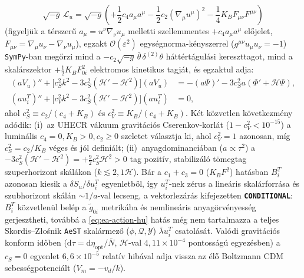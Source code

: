 \documentclass[11pt,a4paper]{article}
\begin{document}
\begin{enumerate}
    \begin{equation}
        \sqrt{-g}\,\mathcal{L}_u = \sqrt{-g}\!\left(+\frac{1}{2} c_4 a_\mu a^\mu - \frac{1}{2} c_2 (\nabla_\mu u^\mu)^2 - \frac{1}{4} K_B F_{\mu\nu} F^{\mu\nu}\right)
        \label{eq:ea-action-hu}
    \end{equation}
    (figyeljük a térszerű $a_\mu = u^\nu\nabla_\nu u_\mu$ melletti szellemmentes $+c_4 a_\mu a^\mu$ előjelet, $F_{\mu\nu} = \nabla_\mu u_\nu - \nabla_\nu u_\mu$), egzakt $\mathcal{O}(\varepsilon^2)$ egységnorma-kényszerrel ($g^{\mu\nu}u_\mu u_\nu = -1$) \texttt{SymPy}-ban megőrzi mind a $-c_2\sqrt{-g}\,\bar\theta\,\delta^{(2)}\theta$ háttértágulási kereszttagot, mind a skalárszektor $+\frac{1}{2} K_B F_{0i}^2$ elektromos kinetikus tagját, és egzaktul adja:
    \begin{equation}
    \begin{aligned}
        (a V_u)'' + \bigl[c_S^2 k^2 - 3 c_S^2 (\mathcal{H}' - \mathcal{H}^2)\bigr](a V_u) &= -(a\Psi)' - 3 c_S^2 a(\Phi' + \mathcal{H}\Psi), \\
        (a u_i^T)'' + \bigl[c_V^2 k^2 - 3 c_S^2 (\mathcal{H}' - \mathcal{H}^2)\bigr](a u_i^T) &= 0,
    \end{aligned}
        \label{eq:aest-director-eoms-hu}
    \end{equation}
    ahol $c_S^2 \equiv c_2/(c_4 + K_B)$ és $c_V^2 \equiv K_B/(c_4 + K_B)$. Két közvetlen következmény adódik: (i)~az UHECR vákuum gravitációs Cserenkov-korlát ($1 - c_V^2 < 10^{-15}$) a luminális $c_4 = 0, K_B > 0, c_2 \ge 0$ szeletet választja ki, ahol $c_V^2 = 1$ azonosan, míg $c_S^2 = c_2/K_B$ véges és jól definiált; (ii)~anyagdominanciában ($a\propto \tau^2$) a $-3 c_S^2(\mathcal{H}'-\mathcal{H}^2) = +\frac{9}{2} c_S^2\mathcal{H}^2 > 0$ tag pozitív, stabilizáló tömegtag szuperhorizont skálákon ($k \lesssim 2{,}1\mathcal{H}$). Bár a $c_1+c_3=0$ ($K_B F^2$) hatásban $B_i^T$ azonosan kiesik a $\delta S_u/\delta u_i^T$ egyenletből, így $u_i^T$-nek zérus a lineáris skalárforrása és szubhorizont skálán $\sim 1/a$-val lecseng, a vektorlezárás kifejezetten \textbf{\texttt{CONDITIONAL}}: $B_i^T$ közvetlenül belép a $\tilde{g}_{0i}$ metrikába és nemlineáris anyagörvényesség gerjesztheti, továbbá a \eqref{eq:ea-action-hu} hatás még nem tartalmazza a teljes Skordis--Z{\l}o\'snik \texttt{AeST} skalármező ($\phi, \mathcal{Q}, \mathcal{Y}$) $\bar\lambda u_i^T$ csatolását. Valódi gravitációs konform időben ($\mathrm{d}\tau = \mathrm{d}\eta_{\mathrm{opt}}/\bar{N}$, $\mathcal{H}$-val $4{,}11\times 10^{-4}$ pontosságú egyezésben) a $c_S = 0$ egyenlet $6{,}6\times 10^{-5}$ relatív hibával adja vissza az élő Boltzmann CDM sebességpotenciált ($V_m = -v_d/k$).

\end{enumerate}
\end{document}
